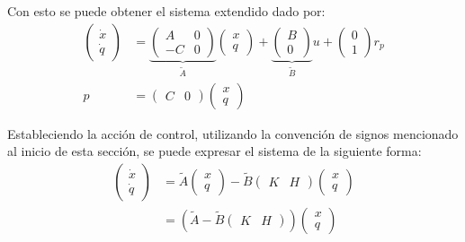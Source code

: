 \documentclass[a4paper,10pt]{article}
\begin{document}
Con esto se puede obtener el sistema extendido dado por: 
\begin{align*}
    \begin{pmatrix} \dot{x} \\ \dot{q} \end{pmatrix} &= 
    \underbrace{\begin{pmatrix}
        A & 0 \\
       -C & 0
    \end{pmatrix}}_{\tilde{A}} 
    \begin{pmatrix} x \\ q \end{pmatrix} + 
    \underbrace{\begin{pmatrix} B \\ 0 \end{pmatrix}}_{\tilde{B}} u 
     + \begin{pmatrix}
         0 \\ 1
     \end{pmatrix} 
     r_p\\
    p &= \begin{pmatrix} C & 0 \end{pmatrix}
    \begin{pmatrix} x \\ q \end{pmatrix}
\end{align*}

Estableciendo la acción de control, utilizando la convención de signos mencionado al inicio de esta sección, se puede expresar el sistema de la siguiente forma:
\begin{align*}
    \begin{pmatrix} \dot{x} \\ \dot{q} \end{pmatrix} &= \tilde{A} 
    \begin{pmatrix} x \\ q \end{pmatrix} - 
    \tilde{B} \begin{pmatrix} K & H \end{pmatrix}  
    \begin{pmatrix} x \\ q \end{pmatrix} \\
     &= \left( \tilde{A} - \tilde{B} \begin{pmatrix} K & H \end{pmatrix} \right)
    \begin{pmatrix} x \\ q \end{pmatrix} \\
\end{align*}
\end{document}
